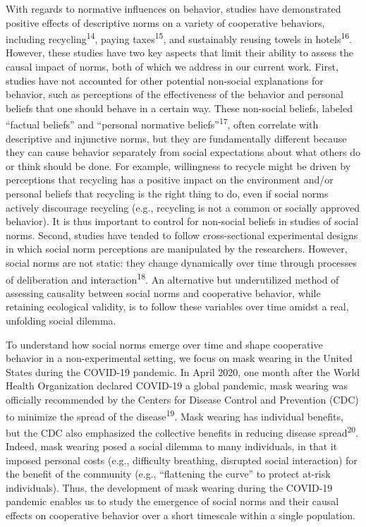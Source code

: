 \documentclass[
  man, donotrepeattitle,floatsintext]{apa6}
\begin{document}
With regards to normative influences on behavior, studies have demonstrated positive effects of descriptive norms on a variety of cooperative behaviors, including recycling\textsuperscript{14}, paying taxes\textsuperscript{15}, and sustainably reusing towels in hotels\textsuperscript{16}. However, these studies have two key aspects that limit their ability to assess the causal impact of norms, both of which we address in our current work. First, studies have not accounted for other potential non-social explanations for behavior, such as perceptions of the effectiveness of the behavior and personal beliefs that one should behave in a certain way. These non-social beliefs, labeled ``factual beliefs'' and ``personal normative beliefs''\textsuperscript{17}, often correlate with descriptive and injunctive norms, but they are fundamentally different because they can cause behavior separately from social expectations about what others do or think should be done. For example, willingness to recycle might be driven by perceptions that recycling has a positive impact on the environment and/or personal beliefs that recycling is the right thing to do, even if social norms actively discourage recycling (e.g., recycling is not a common or socially approved behavior). It is thus important to control for non-social beliefs in studies of social norms. Second, studies have tended to follow cross-sectional experimental designs in which social norm perceptions are manipulated by the researchers. However, social norms are not static: they change dynamically over time through processes of deliberation and interaction\textsuperscript{18}. An alternative but underutilized method of assessing causality between social norms and cooperative behavior, while retaining ecological validity, is to follow these variables over time amidst a real, unfolding social dilemma.

To understand how social norms emerge over time and shape cooperative behavior in a non-experimental setting, we focus on mask wearing in the United States during the COVID-19 pandemic. In April 2020, one month after the World Health Organization declared COVID-19 a global pandemic, mask wearing was officially recommended by the Centers for Disease Control and Prevention (CDC) to minimize the spread of the disease\textsuperscript{19}. Mask wearing has individual benefits, but the CDC also emphasized the collective benefits in reducing disease spread\textsuperscript{20}. Indeed, mask wearing posed a social dilemma to many individuals, in that it imposed personal costs (e.g., difficulty breathing, disrupted social interaction) for the benefit of the community (e.g., ``flattening the curve'' to protect at-risk individuals). Thus, the development of mask wearing during the COVID-19 pandemic enables us to study the emergence of social norms and their causal effects on cooperative behavior over a short timescale within a single population.
\end{document}
